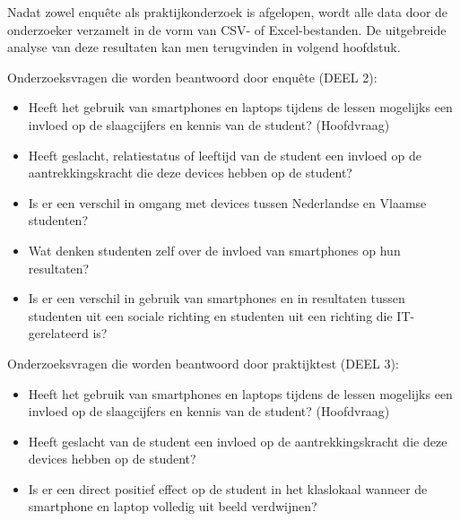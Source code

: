 Nadat zowel enquête als praktijkonderzoek is afgelopen, wordt alle data door de onderzoeker verzamelt in de vorm van CSV- of Excel-bestanden. De uitgebreide analyse van deze resultaten kan men terugvinden in volgend hoofdstuk.

Onderzoeksvragen die worden beantwoord door enquête (DEEL 2):
\begin{itemize}
	\item Heeft het gebruik van smartphones en laptops tijdens de lessen mogelijks een invloed op de slaagcijfers en kennis van de student? (Hoofdvraag)
	\item Heeft geslacht, relatiestatus of leeftijd van de student een invloed op de aantrekkingskracht die deze devices hebben op de student?
	\item Is er een verschil in omgang met devices tussen Nederlandse en Vlaamse studenten?
	\item Wat denken studenten zelf over de invloed van smartphones op hun resultaten?
	\item Is er een verschil in gebruik van smartphones en in resultaten tussen studenten uit een sociale richting en studenten uit een richting die IT-gerelateerd is?
\end{itemize}

Onderzoeksvragen die worden beantwoord door praktijktest (DEEL 3):
\begin{itemize}
	\item Heeft het gebruik van smartphones en laptops tijdens de lessen mogelijks een invloed op de slaagcijfers en kennis van de student? (Hoofdvraag)
	\item Heeft geslacht van de student een invloed op de aantrekkingskracht die deze devices hebben op de student?
	\item Is er een direct positief effect op de student in het klaslokaal wanneer de smartphone en laptop volledig uit beeld verdwijnen?
\end{itemize}


